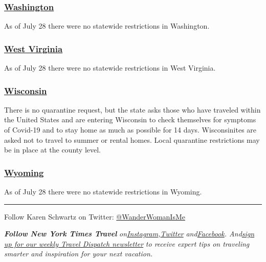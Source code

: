 \hypertarget{washington}{%
\subsubsection{\texorpdfstring{\href{https://www.experiencewa.com/articles/date-coronavirus-travel-advisory}{Washington}}{Washington}}\label{washington}}

As of July 28 there were no statewide restrictions in Washington.

\hypertarget{west-virginia}{%
\subsubsection{\texorpdfstring{\href{https://wvtourism.com/travel-alert/}{West
Virginia}}{West Virginia}}\label{west-virginia}}

As of July 28 there were no statewide restrictions in West Virginia.

\hypertarget{wisconsin}{%
\subsubsection{\texorpdfstring{\href{https://www.dhs.wisconsin.gov/covid-19/travel.htm}{Wisconsin}}{Wisconsin}}\label{wisconsin}}

There is no quarantine request, but the state asks those who have
traveled within the United States and are entering Wisconsin to check
themselves for symptoms of Covid-19 and to stay home as much as possible
for 14 days. Wisconsinites are asked not to travel to summer or rental
homes. Local quarantine restrictions may be in place at the county
level.

\hypertarget{wyoming}{%
\subsubsection{\texorpdfstring{\href{https://health.wyo.gov/publichealth/infectious-disease-epidemiology-unit/disease/novel-coronavirus/covid-19-orders-and-guidance/}{Wyoming}}{Wyoming}}\label{wyoming}}

As of July 28 there were no statewide restrictions in Wyoming.

\begin{center}\rule{0.5\linewidth}{\linethickness}\end{center}

Follow Karen Schwartz on Twitter:
\href{https://twitter.com/wanderwomanisme?lang=en}{@WanderWomanIsMe}

\emph{\textbf{Follow New York Times Travel}}
\emph{on}\href{https://www.instagram.com/nytimestravel/}{\emph{Instagram}}\emph{,}\href{https://twitter.com/nytimestravel}{\emph{Twitter}}
\emph{and}\href{https://www.facebookcorewwwi.onion/nytimestravel/}{\emph{Facebook}}\emph{.
And}\href{https://www.nytimes3xbfgragh.onion/newsletters/traveldispatch}{\emph{sign
up for our weekly Travel Dispatch newsletter}} \emph{to receive expert
tips on traveling smarter and inspiration for your next vacation.}

